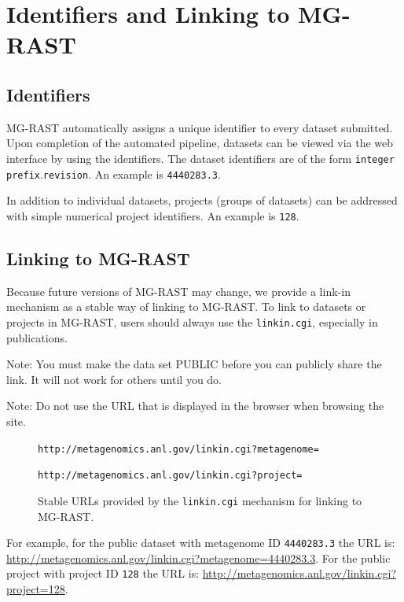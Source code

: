 \documentclass[12pt,fullpage]{report}
\begin{document}
\section{Identifiers and Linking to MG-RAST}
\subsection{Identifiers}
\label{section:identifier}
MG-RAST automatically assigns a unique identifier to every dataset submitted. Upon completion of the automated pipeline, datasets can be viewed via the web interface by using the identifiers.
The dataset identifiers are of the form \texttt{integer prefix}.\texttt{revision}.
An example is \texttt{4440283.3}.

In addition to individual datasets, projects (groups of datasets) can be addressed with simple numerical project identifiers.
An example is \texttt{128}.
\subsection{Linking to MG-RAST}
\label{section:linkin}
Because future versions of MG-RAST may change, we provide a link-in mechanism as a stable way of linking to MG-RAST. To link to datasets or projects in MG-RAST, users should always use the \texttt{linkin.cgi}, especially in publications.

Note: You must make the data set PUBLIC before you can publicly share the link. It will not work for others until you do.

Note: Do not use the URL that is displayed in the browser when browsing the site.

\begin{figure}[ht]

\texttt{http://metagenomics.anl.gov/linkin.cgi?metagenome=}

\texttt{http://metagenomics.anl.gov/linkin.cgi?project=}

\caption{Stable URLs provided by the \texttt{linkin.cgi} mechanism for linking to MG-RAST.}
\label{fig:linkin.cgi}

\end{figure}

For example, for the public dataset with metagenome ID \texttt{4440283.3} the URL is:
\url{http://metagenomics.anl.gov/linkin.cgi?metagenome=4440283.3}.
For the public project with project ID  \texttt{128} the URL is:
\url{http://metagenomics.anl.gov/linkin.cgi?project=128}.
\end{document}
